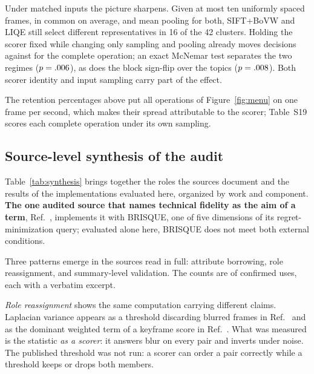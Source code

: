 Under matched inputs the picture sharpens. Given at most ten uniformly spaced
frames, \casQuadrosMedia{} in common on average, and mean pooling for both, SIFT+BoVW and
LIQE still select different representatives in 16 of the 42 clusters.
Holding the scorer fixed while changing only sampling and pooling already moves
\casSoCasamento{} decisions against \casCompleta{} for the complete operation; an exact
McNemar test separates the two regimes ($p=.006{}$), as does the block sign-flip over the
\mcnBlocos{} topics ($p=.008{}$). Both scorer identity and input sampling carry part of the effect.

The retention percentages above put all \disOps{} operations of Figure~\ref{fig:menu}
on one frame per second, which makes their spread attributable to the scorer; Table~S19
scores each complete operation under its own sampling.

\subsection{Source-level synthesis of the audit}\label{sec:synthesis}

Table~\ref{tab:synthesis} brings together the roles the sources document and the results of
the implementations evaluated here, organized by work and component. \textbf{The one audited source that names technical fidelity as the aim of a term}, Ref.~\citep{xu2024property}, implements it with BRISQUE, one of five dimensions of its regret-minimization query; evaluated alone here, BRISQUE does not meet both external conditions.




Three patterns emerge in the sources read in full: attribute borrowing, role
reassignment, and summary-level validation. The counts are of confirmed uses, each with a verbatim excerpt.

\emph{Role reassignment} shows the same computation carrying different claims. Laplacian
variance appears as a threshold discarding blurred frames in Ref.~\citep{cakmak2025tripss} and as the dominant weighted term of a keyframe score in Ref.~\citep{korolkov2025keyframe}. What
was measured is the statistic \emph{as a scorer}: it answers blur on every pair and
inverts under noise. The published threshold was not run: a scorer can order a pair correctly while a threshold keeps or drops both members.


